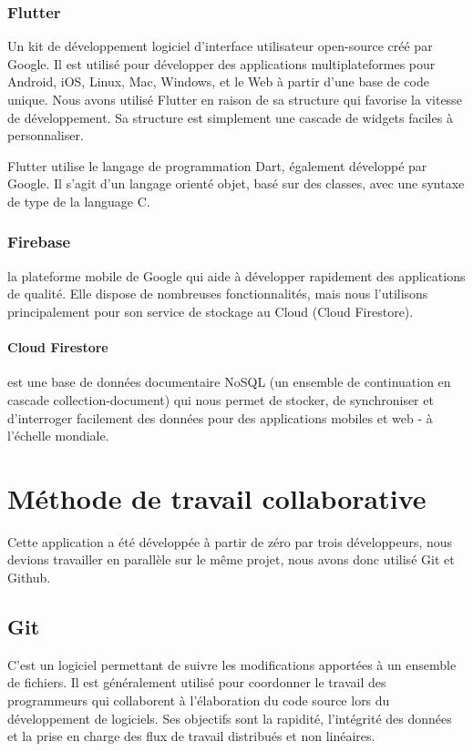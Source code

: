 \documentclass[french, a4paper, french]{report}
\begin{document}
			\subsubsection*{Flutter} Un kit de développement logiciel d'interface utilisateur open-source créé par Google. Il est utilisé pour développer des applications multiplateformes pour Android, iOS, Linux, Mac, Windows, et le Web à partir d'une base de code unique.
Nous avons utilisé Flutter en raison de sa structure qui favorise la vitesse de développement. Sa structure est simplement une cascade de widgets faciles à personnaliser.

Flutter utilise le langage de programmation Dart, également développé par Google. Il s'agit d'un langage orienté objet, basé sur des classes, avec une syntaxe de type de la language C.
			\subsubsection*{Firebase} la plateforme mobile de Google qui aide à développer rapidement des applications de qualité. Elle dispose de nombreuses fonctionnalités, mais nous l'utilisons principalement pour son service de stockage au Cloud (Cloud Firestore).
				\paragraph*{Cloud Firestore} est une base de données documentaire NoSQL (un ensemble de continuation en cascade collection-document) qui nous permet de stocker, de synchroniser et d'interroger facilement des données pour des applications mobiles et web - à l'échelle mondiale.
	\section{Méthode de travail collaborative}
		Cette application a été développée à partir de zéro par trois développeurs, nous devions travailler en parallèle sur le même projet, nous avons donc utilisé Git et Github.

		\subsection*{Git} C'est un logiciel permettant de suivre les modifications apportées à un ensemble de fichiers. Il est généralement utilisé pour coordonner le travail des programmeurs qui collaborent à l'élaboration du code source lors du développement de logiciels. Ses objectifs sont la rapidité, l'intégrité des données et la prise en charge des flux de travail distribués et non linéaires.
\end{document}
